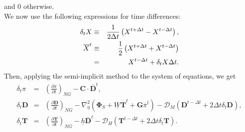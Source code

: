 and 0 otherwise.\\
We now use the following expressions for time differences: \begin{eqnarray}
  \delta_{t} {X} &\equiv & \frac{1}{2 \Delta t}
        \left( {X}^{t+\Delta t} - {X}^{t-\Delta t} \right), \\
    \overline{X}^{t} &\equiv & \frac{1}{2} \left( {X}^{t+\Delta t}  + {X}^{t-\Delta t} \right)\notag\\
  &=&  {X}^{t-\Delta t} + \delta_{t} {X} \Delta t.   \end{eqnarray} Then, applying the semi-implicit method to the system of equations, we get \begin{eqnarray}
\label{eqn_for_pi}
  \delta_{t} \pi &=&
          \left( \frac{\partial \pi}{\partial t} \right)_{NG}
     - {\mathbf{C}} \cdot \overline{ {\mathbf{D}} }^{t}, \\
  \delta_{t} {\mathbf{D}} &=&
          \left( \frac{\partial {\mathbf{D}}}{\partial t} \right)_{NG}
          - \nabla^{2}_{\eta} ( {\mathbf{\Phi}}_{S}
                                  + \underline{W}
                                     \overline{ {\mathbf{T}} }^{t}
                                  + {\mathbf{G}}
                                  \overline{\pi}^{t} )
          - {\mathcal D}_M ( {\mathbf{D}}^{t-\Delta t}
                         + 2 \Delta t \delta_{t} {\mathbf{D}} ), \\
\label{eqn_for_t}
  \delta_{t} {\mathbf{T}} &=&
        \left( \frac{\partial {\mathbf{T}}}{\partial t} \right)_{NG}
         - \underline{h} \overline{ {\mathbf{D}} }^{t}
         - {\mathcal D}_H ( {\mathbf{T}}^{t-\Delta t}
                        + 2 \Delta t \delta_{t} {\mathbf{T}} ).   \end{eqnarray}

